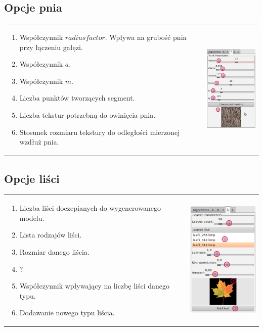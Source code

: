 \subsection{Opcje pnia}
\begin{tabular}{lr}
\parbox[b]{95mm}{
\begin{enumerate}
	\item {Współczynnik $radius factor$. Wpływa na grubość pnia przy łączeniu gałęzi.}
	\item {Współczynnik $a$.}
	\item {Współczynnik $m$.}
	\item {Liczba punktów tworzących segment.}
	\item {Liczba tekstur potrzebną do owinięcia pnia.}
	\item {Stosunek rozmiaru tekstury do odległości mierzonej wzdłuż pnia.}
\end{enumerate}
} &
\includegraphics[width=35mm]{images/gui/trunk_panel.png}\\
\end{tabular}

\subsection{Opcje liści}
\begin{tabular}{lr}
\parbox[b]{95mm}{
\begin{enumerate}
	\item {Liczba liści doczepianych do wygenerowanego modelu.}
	\item {Lista rodzajów liści.}
	\item {Rozmiar danego liścia.}
	\item {?}
	\item {Współczynnik wpływający na liczbę liści danego typu.}
	\item {Dodawanie nowego typu liścia.}
\end{enumerate}
} &
\includegraphics[width=35mm]{images/gui/leaves_panel.png}\\
\end{tabular}




